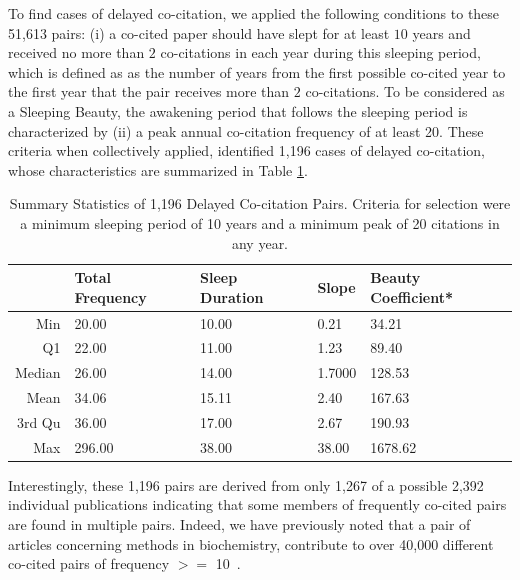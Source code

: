 \documentclass[utf8]{frontiersSCNS}
\newcommand\Tstrut{\rule{0pt}{2.9ex}} %
\begin{document}
To find cases of delayed co-citation, we applied the following conditions to these 51,613 pairs: (i)  a co-cited paper should have slept for at least $10$ years and received no more than $2$ co-citations in each year during this sleeping period, which is defined as as the number of years from the first possible co-cited year to the first year that the pair receives more than $2$ co-citations. To be considered as a Sleeping Beauty, the awakening period that follows the sleeping period is characterized by (ii) a peak annual co-citation frequency of at least 20. These criteria when collectively applied, identified 1,196 cases of delayed co-citation, whose characteristics are summarized in Table \ref{tab:table2}. 

\begin{table}[ht]
\caption{Summary Statistics of 1,196 Delayed Co-citation Pairs. Criteria for selection were a minimum sleeping period of 10 years and a minimum peak of 20 citations in any year.}%
\centering %
\begin{center}
\begin{tabular}{rllll} 
& Total Frequency & Sleep Duration & Slope & Beauty Coefficient* \\
\hline %
Min &  20.00 & 10.00 & 0.21 & 34.21   \Tstrut\\ 
Q1  &  22.00 & 11.00  & 1.23 & 89.40   \\ 
Median & 26.00 & 14.00 & 1.7000 & 128.53   \\ 
Mean & 34.06 & 15.11 & 2.40 & 167.63   \\ 
3rd Qu & 36.00 & 17.00 & 2.67 & 190.93   \\ 
Max & 296.00 & 38.00  & 38.00  & 1678.62   \\ 
\hline
\end{tabular}
\end{center}
\label{tab:table2} %
\end{table}

Interestingly, these 1,196 pairs are derived from only 1,267 of a possible 2,392 individual publications indicating that some members of frequently co-cited pairs are found in multiple pairs. Indeed, we have previously noted that a pair of articles concerning methods in biochemistry, contribute to over 40,000 different co-cited pairs of frequency $>=$ 10~\citep{devarakonda_2020}.  
\end{document}
